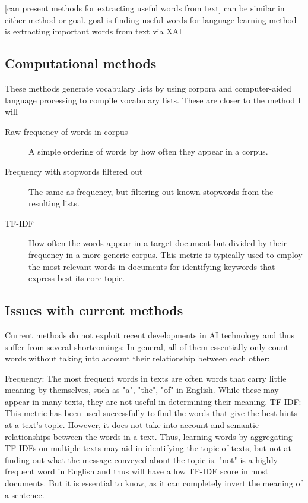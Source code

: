 [can present methods for extracting useful words from text]
can be similar in either method or goal.
goal is finding useful words for language learning
method is extracting important words from text via XAI

\subsection{Computational methods}
These methods generate vocabulary lists by using corpora and computer-aided language processing to compile vocabulary lists.
These are closer to the method I will

\begin{description}
	\item [Raw frequency of words in corpus]
	      A simple ordering of words by how often they appear in a corpus.
	\item [Frequency with stopwords filtered out]
	      The same as frequency, but filtering out known stopwords from the resulting lists.
	\item [TF-IDF]
	      How often the words appear in a target document but divided by their frequency in a more generic corpus.
	      This metric is typically used to employ the most relevant words in documents for identifying keywords that express best its core topic.
\end{description}

\subsection{Issues with current methods}
Current methods do not exploit recent developments in AI technology and thus suffer from several shortcomings:
In general, all of them essentially only count words without taking into account their relationship between each other:

Frequency: The most frequent words in texts are often words that carry little meaning by themselves, such as "a", "the", "of" in English.
While these may appear in many texts, they are not useful in determining their meaning.
TF-IDF: This metric has been used successfully to find the words that give the best hints at a text's topic.
However, it does not take into account and semantic relationships between the words in a text.
Thus, learning words by aggregating TF-IDFs on multiple texts may aid in identifying the topic of texts, but not at finding out what the message conveyed about the topic is.
"not" is a highly frequent word in English and thus will have a low TF-IDF score in most documents. But it is essential to know, as it can completely invert the meaning of a sentence.

